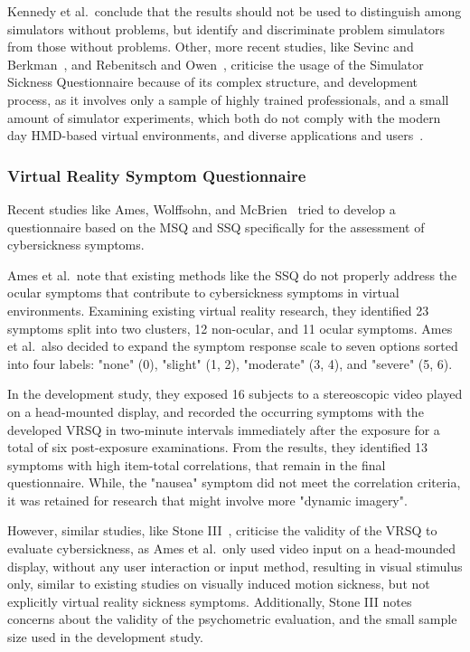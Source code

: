 Kennedy et al.\ conclude that the results should not be used to distinguish among simulators without problems, but
identify and discriminate problem simulators from those without problems.
Other, more recent studies, like Sevinc and Berkman~\cite{Sevinc2020}, and Rebenitsch and Owen~\cite{Rebenitsch2016},
criticise the usage of the Simulator Sickness Questionnaire because of its complex structure, and development
process, as it involves only a sample of highly trained professionals, and a small amount of simulator experiments,
which both do not comply with the modern day HMD-based virtual environments, and diverse applications
and users~\cite{Sevinc2020}.


\subsubsection{Virtual Reality Symptom Questionnaire}\label{subsubsec:virtual-reality-symptom-questionnaire}

Recent studies like Ames, Wolffsohn, and McBrien~\cite{Ames2005} tried to develop a questionnaire based on the MSQ
and SSQ specifically for the assessment of cybersickness symptoms.

Ames et al.\ note that existing methods like the SSQ do not properly address the ocular symptoms that
contribute to cybersickness symptoms in virtual environments.
Examining existing virtual reality research, they identified 23 symptoms split into two clusters, 12 non-ocular, and
11 ocular symptoms.
Ames et al.\ also decided to expand the symptom response scale to seven options sorted into four
labels: "none" (0), "slight" (1, 2), "moderate" (3, 4), and "severe" (5, 6).

In the development study, they exposed 16 subjects to a stereoscopic video played on a
head-mounted display, and recorded the occurring symptoms with the developed VRSQ in two-minute
intervals immediately after the exposure for a total of six post-exposure examinations.
From the results, they identified 13 symptoms with high item-total correlations, that remain in the final
questionnaire.
While, the "nausea" symptom did not meet the correlation criteria, it was retained for research that might involve
more "dynamic imagery".

However, similar studies, like Stone III~\cite{Stone2017}, criticise the validity of the VRSQ to evaluate
cybersickness, as Ames et al.\ only used video input on a head-mounded display, without any user interaction or input
method, resulting in visual stimulus only, similar to existing studies on visually induced motion sickness, but not
explicitly virtual reality sickness symptoms.
Additionally, Stone III notes concerns about the validity of the psychometric evaluation, and the small sample size
used in the development study.

